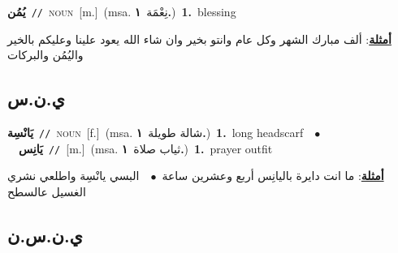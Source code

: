\documentclass[10pt,a4paper,twoside]{article} %
\begin{document}
\begin{multicols}{2}
{{{{{{{\setlength\topsep{0pt}\textbf{\foreignlanguage{arabic}{يُمُن}}\ {\color{gray}\texttt{//}\color{black}}\ \textsc{noun}\ [m.]\ \color{gray}(msa. \foreignlanguage{arabic}{نِعْمَة}~\foreignlanguage{arabic}{\textbf{١.}})\color{black}\ \textbf{1.}~blessing\  \begin{flushright}\color{gray}\foreignlanguage{arabic}{\textbf{\underline{\foreignlanguage{arabic}{أمثلة}}}: ألف مبارك الشهر وكل عام وانتو بخير وان شاء الله يعود علينا وعليكم بالخير واليُمُن والبركات}\end{flushright}\color{black}} \vspace{2mm}

\vspace{-3mm}
\subsection*{\color{blue}\foreignlanguage{arabic}{ي.ن.س}\color{blue}{ (ntws)}} 

{\setlength\topsep{0pt}\textbf{\foreignlanguage{arabic}{يَانْسِة}}\ {\color{gray}\texttt{//}\color{black}}\ \textsc{noun}\ [f.]\ \color{gray}(msa. \foreignlanguage{arabic}{شالة طويلة}~\foreignlanguage{arabic}{\textbf{١.}})\color{black}\ \textbf{1.}~long headscarf\ \ $\bullet$\ \ \setlength\topsep{0pt}\textbf{\foreignlanguage{arabic}{يَانِس}}\ {\color{gray}\texttt{//}\color{black}}\ [m.]\ \color{gray}(msa. \foreignlanguage{arabic}{ثياب صلاة}~\foreignlanguage{arabic}{\textbf{١.}})\color{black}\ \textbf{1.}~prayer outfit\  \begin{flushright}\color{gray}\foreignlanguage{arabic}{\textbf{\underline{\foreignlanguage{arabic}{أمثلة}}}: ما انت دايرة باليانِس أربع وعشرين ساعة\ $\bullet$\ \  البسي يانْسِة واطلعي نشري الغسيل عالسطح}\end{flushright}\color{black}} \vspace{2mm}

\vspace{-3mm}
\subsection*{\color{blue}\foreignlanguage{arabic}{ي.ن.س.ن}\color{blue}{ (ntws)}} 

}}}}}}
\end{multicols}
\end{document}
